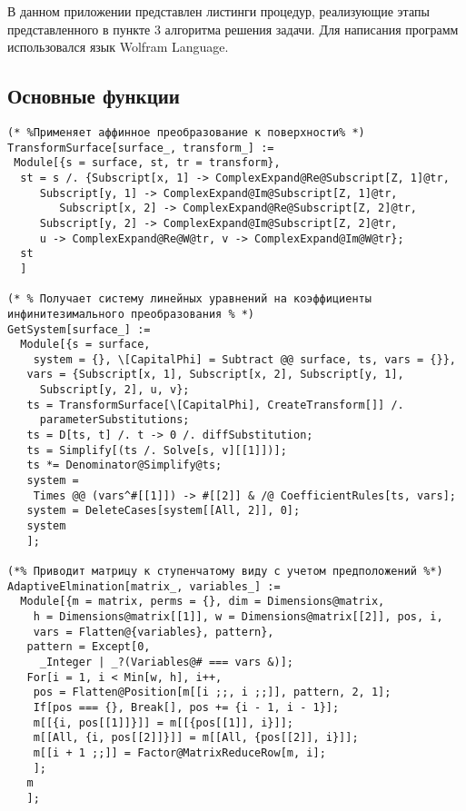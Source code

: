 \documentclass[../main.tex]{subfiles}
\begin{document}
В данном приложении представлен листинги процедур, реализующие этапы представленного в пункте 3 алгоритма решения задачи. Для написания программ использовался язык {\ttfamily Wolfram Language}. 

\subsection{Основные функции}
\begin{lstlisting}      
(* %Применяет аффинное преобразование к поверхности% *)
TransformSurface[surface_, transform_] :=
 Module[{s = surface, st, tr = transform},
  st = s /. {Subscript[x, 1] -> ComplexExpand@Re@Subscript[Z, 1]@tr, 
     Subscript[y, 1] -> ComplexExpand@Im@Subscript[Z, 1]@tr,
     	Subscript[x, 2] -> ComplexExpand@Re@Subscript[Z, 2]@tr, 
     Subscript[y, 2] -> ComplexExpand@Im@Subscript[Z, 2]@tr,
     u -> ComplexExpand@Re@W@tr, v -> ComplexExpand@Im@W@tr};
  st
  ]
  
(* % Получает систему линейных уравнений на коэффициенты инфинитезимального преобразования % *)
GetSystem[surface_] :=
  Module[{s = surface, 
    system = {}, \[CapitalPhi] = Subtract @@ surface, ts, vars = {}},
   vars = {Subscript[x, 1], Subscript[x, 2], Subscript[y, 1], 
     Subscript[y, 2], u, v};
   ts = TransformSurface[\[CapitalPhi], CreateTransform[]] /. 
     parameterSubstitutions;
   ts = D[ts, t] /. t -> 0 /. diffSubstitution;
   ts = Simplify[(ts /. Solve[s, v][[1]])];
   ts *= Denominator@Simplify@ts;
   system = 
    Times @@ (vars^#[[1]]) -> #[[2]] & /@ CoefficientRules[ts, vars];
   system = DeleteCases[system[[All, 2]], 0];
   system
   ];
   
(*% Приводит матрицу к ступенчатому виду с учетом предположений %*)
AdaptiveElmination[matrix_, variables_] :=
  Module[{m = matrix, perms = {}, dim = Dimensions@matrix,
    h = Dimensions@matrix[[1]], w = Dimensions@matrix[[2]], pos, i,
    vars = Flatten@{variables}, pattern},
   pattern = Except[0,
     _Integer | _?(Variables@# === vars &)];
   For[i = 1, i < Min[w, h], i++,
    pos = Flatten@Position[m[[i ;;, i ;;]], pattern, 2, 1];
    If[pos === {}, Break[], pos += {i - 1, i - 1}];
    m[[{i, pos[[1]]}]] = m[[{pos[[1]], i}]];
    m[[All, {i, pos[[2]]}]] = m[[All, {pos[[2]], i}]];
    m[[i + 1 ;;]] = Factor@MatrixReduceRow[m, i];
    ];
   m
   ];
   

\end{lstlisting}
\end{document}
